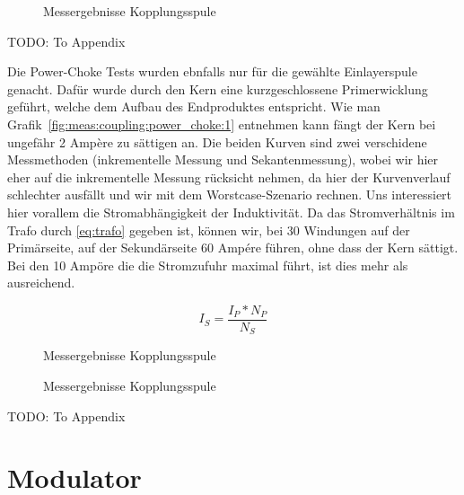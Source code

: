 \begin{figure}[h!tb]
    \centering
    
    \caption[Messresultate Kopplungsspule]{Messergebnisse Kopplungsspule}
    \label{fig:meas:coupling:coil:R}
\end{figure}
TODO: To Appendix

Die Power-Choke Tests wurden ebnfalls nur für die gewählte Einlayerspule genacht. Dafür wurde durch den Kern eine kurzgeschlossene Primerwicklung geführt, welche dem Aufbau des Endproduktes entspricht. Wie man Grafik~\ref{fig:meas:coupling:power_choke:1} entnehmen kann fängt der Kern bei ungefähr 2 Ampère zu sättigen an. Die beiden Kurven sind zwei verschidene Messmethoden (inkrementelle Messung und Sekantenmessung), wobei wir hier eher auf die inkrementelle Messung rücksicht nehmen, da hier der Kurvenverlauf schlechter ausfällt und wir mit dem Worstcase-Szenario rechnen. Uns interessiert hier vorallem die Stromabhängigkeit der Induktivität.
Da das Stromverhältnis im Trafo durch \ref{eq:trafo} gegeben ist, können wir, bei 30 Windungen auf der Primärseite, auf der Sekundärseite 60 Ampére führen, ohne dass der Kern sättigt. Bei den 10 Ampöre die die Stromzufuhr maximal führt, ist dies mehr als ausreichend.

\begin{equation}\label{eq:trafo}
    I_S = \frac{I_P * N_P}{N_S}
\end{equation}

\begin{figure}[h!tb]
    \centering
    
    \caption[Messresultate Kopplungsspule]{Messergebnisse Kopplungsspule}
    \label{fig:meas:coupling:coil:power_choke:1}
\end{figure}

\begin{figure}[h!tb]
    \centering
    
    \caption[Messresultate Kopplungsspule]{Messergebnisse Kopplungsspule}
    \label{fig:meas:coupling:coil:power_choke:2}
\end{figure}
TODO: To Appendix

\section{Modulator}
\label{sec:val:modulator}

